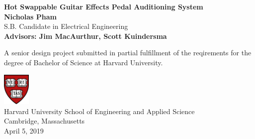 \begin{titlepage}
	\begin{center}
		\vspace*{0.5in}
		\huge
		\textbf{Hot Swappable Guitar Effects Pedal Auditioning System}\\
		\vspace*{1in}
		\Large
		\textbf{Nicholas Pham} \\
		S.B. Candidate in Electrical Engineering \\
		\vspace*{0.5in}
		\textbf{Advisors: Jim MacAurthur, Scott Kuindersma}

		\vfill

		A senior design project submitted in partial fulfillment of the reqirements for the degree of Bachelor of Science at Harvard University. \\
		\vspace*{0.1in}

		\includegraphics[width = 0.1\textwidth]{FinalImages/Harvard_shield-University.png}\\
		
		\vspace*{0.1in}
	    Harvard University School of Engineering and Applied Science \\
	    Cambridge, Massachusetts \\
	    April 5, 2019
	\end{center}
\end{titlepage}